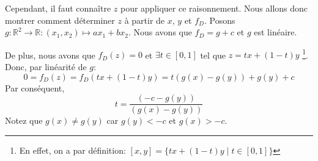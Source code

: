 Cependant, il faut connaître $z$ pour appliquer ce raisonnement. Nous allons
donc montrer comment déterminer $z$ à partir de $x$, $y$ et $f_D$.
Posons $g: \mathbb{R}^2 \to \mathbb{R}: (x_1, x_2)\mapsto a x_1 + b x_2$.
Nous avons que $f_D = g + c $ et $g$ est linéaire.

De plus, nous avons que $f_D(z) = 0$ et $\exists t \in [0,1]$ tel que $ z = tx+ (1-t)y$
\footnote{En effet, on a par définition: $[x, y] = \{tx + (1 - t)y\mid t\in [0,1]\}$}.
Donc, par linéarité de $g$:
$$0 = f_D(z)  = f_D (tx+ (1-t)y) = t(g(x)-g(y))+g(y)+c$$
Par conséquent, $$t = \frac{(-c - g(y))}{(g(x)-g(y))}$$
Notez que $g(x) \neq g(y)$ car $ g(y) < -c  $ et $g(x) > -c$.

